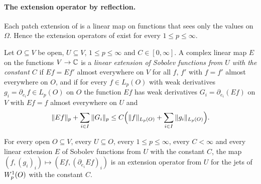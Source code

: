 \paragraph{The extension operator by reflection.}

Each patch extension of  is a linear map on functions that sees
only the values on $\Omega$. Hence the extension operators of 
exist for every $1 \leq p \leq \infty$.

\begin{definition}
\label{def:sobolev-extension-map}
\leanok
{}
Let $O \subseteq V$ be open, $U \subseteq V$, $1 \leq p \leq \infty$ and $C \in [0, \infty]$. A
complex linear map $E$ on the functions $V \to \mathbb{C}$ is a \emph{linear extension of Sobolev
functions from $U$ with the constant $C$} if $E f = E f'$ almost everywhere on $V$ for all $f$,
$f'$ with $f = f'$ almost everywhere on $O$, and if for every $f \in L_p(O)$ with weak derivatives
$g_i = \partial_{e_i} f \in L_p(O)$ on $O$ the function $E f$ has weak derivatives
$G_i = \partial_{e_i} (E f)$ on $V$ with $E f = f$ almost everywhere on $U$ and
\[
  \|E f\|_p + \sum_{i \in I} \|G_i\|_p \leq C \Bigl(\|f\|_{L_p(O)} + \sum_{i \in I}
  \|g_i\|_{L_p(O)}\Bigr) .
\]
\end{definition}

\begin{lemma}
\label{lem:sobolev-extension-map-op}
\leanok
{}
For every open $O \subseteq V$, every $U \subseteq O$, every $1 \leq p \leq \infty$, every
$C < \infty$ and every linear extension $E$ of Sobolev functions from $U$ with the constant $C$,
the map $(f, (g_i)_i) \mapsto (E f, (\partial_{e_i} E f)_i)$ is an extension operator from $U$
for the jets of $W^{1}_{p}(O)$ with the constant $C$.
\end{lemma}

